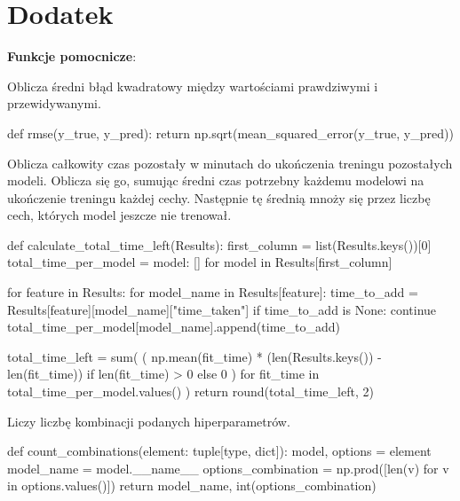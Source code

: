 {}
\justify
\fontsize{14}{16}\selectfont
\setlength{\parindent}{0pt}
\chapter*{Dodatek} 
\fontsize{12}{14}\selectfont
\textbf{Funkcje pomocnicze}:

\vspace{\baselineskip}

Oblicza średni błąd kwadratowy między wartościami prawdziwymi i przewidywanymi.
\begin{pythoncode}
def rmse(y_true, y_pred):
    return np.sqrt(mean_squared_error(y_true, y_pred))
\end{pythoncode}

\vspace{\baselineskip}
\hspace{1.5cm} Oblicza całkowity czas pozostały w minutach do ukończenia treningu pozostałych modeli.
Oblicza się go, sumując średni czas potrzebny każdemu modelowi na ukończenie treningu każdej cechy.
Następnie tę średnią mnoży się przez liczbę cech, których model jeszcze nie trenował.
\begin{pythoncode}
def calculate_total_time_left(Results):
    first_column = list(Results.keys())[0]
    total_time_per_model = {model: [] for model in Results[first_column]}

    for feature in Results:
        for model_name in Results[feature]:
            time_to_add = Results[feature][model_name]["time_taken"]
            if time_to_add is None:
                continue
            total_time_per_model[model_name].append(time_to_add)

    total_time_left = sum(
        (
            np.mean(fit_time) * (len(Results.keys()) - len(fit_time))
            if len(fit_time) > 0
            else 0
        )
        for fit_time in total_time_per_model.values()
    )
    return round(total_time_left, 2)
\end{pythoncode}


\vspace{\baselineskip}
Liczy liczbę kombinacji podanych hiperparametrów.
\begin{pythoncode}
def count_combinations(element: tuple[type, dict]):
    model, options = element
    model_name = model.__name__
    options_combination = np.prod([len(v) for v in options.values()])
    return model_name, int(options_combination)
\end{pythoncode}

